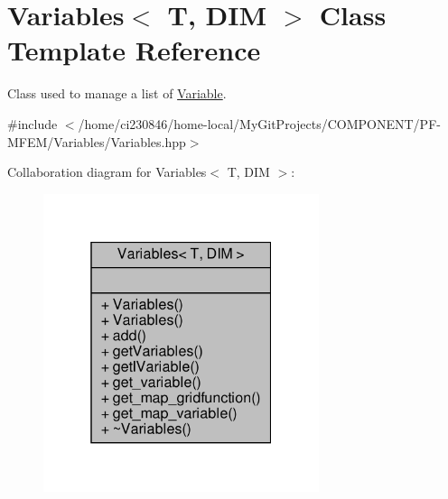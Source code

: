 \hypertarget{classVariables}{}\section{Variables$<$ T, D\+IM $>$ Class Template Reference}
\label{classVariables}


Class used to manage a list of \hyperlink{classVariable}{Variable}.  




{\ttfamily \#include $<$/home/ci230846/home-\/local/\+My\+Git\+Projects/\+C\+O\+M\+P\+O\+N\+E\+N\+T/\+P\+F-\/\+M\+F\+E\+M/\+Variables/\+Variables.\+hpp$>$}



Collaboration diagram for Variables$<$ T, D\+IM $>$\+:\nopagebreak
\begin{figure}[H]
\begin{center}
\leavevmode
\includegraphics[width=229pt]{classVariables__coll__graph}
\end{center}
\end{figure}
